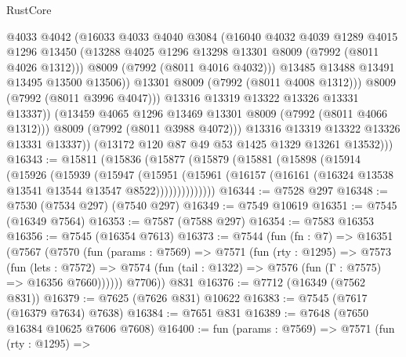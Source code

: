 \begin{lexlean}{RustCore}
\begin{coremodule}
                        @4033
                        @4042
                        (@16033
                          @4033
                          @4040
                          @3084
                          (@16040
                            @4032
                            @4039
                            @1289
                            @4015
                            @1296
                            @13450
                            (@13288 @4025 @1296 @13298 @13301 @8009 (@7992 (@8011 @4026 @1312)))
                            @8009
                            (@7992 (@8011 @4016 @4032)))
                          @13485
                          @13488
                          @13491
                          @13495
                          @13500
                          @13506))
                      @13301
                      @8009
                      (@7992 (@8011 @4008 @1312)))
                    @8009
                    (@7992 (@8011 @3996 @4047)))
                  @13316
                  @13319
                  @13322
                  @13326
                  @13331
                  @13337))
              (@13459 @4065 @1296 @13469 @13301 @8009 (@7992 (@8011 @4066 @1312)))
              @8009
              (@7992 (@8011 @3988 @4072)))
            @13316
            @13319
            @13322
            @13326
            @13331
            @13337))
        (@13172 @120 @87 @49 @53 @1425 @1329 @13261 @13532)))
@16343 := @15811
    (@15836
      (@15877
        (@15879
          (@15881
            (@15898
              (@15914
                (@15926
                  (@15939
                    (@15947
                      (@15951
                        (@15961
                          (@16157 (@16161 (@16324 @13538 @13541 @13544 @13547 @8522))))))))))))))
@16344 := @7528 @297
@16348 := @7530 (@7534 @297) (@7540 @297)
@16349 := @7549 @10619
@16351 := @7545 (@16349 @7564)
@16353 := @7587 (@7588 @297)
@16354 := @7583 @16353
@16356 := @7545 (@16354 @7613)
@16373 := @7544
    (fun (fn : @7) =>
    @16351
      (@7567
        (@7570
          (fun (params : @7569) =>
          @7571
            (fun (rty : @1295) =>
            @7573
              (fun (lets : @7572) =>
              @7574 (fun (tail : @1322) => @7576 (fun (Γ : @7575) => @16356 @7660))))))
        @7706))
    @831
@16376 := @7712 (@16349 (@7562 @831))
@16379 := @7625 (@7626 @831) @10622
@16383 := @7545 (@7617 (@16379 @7634) @7638)
@16384 := @7651 @831
@16389 := @7648 (@7650 @16384 @10625 @7606 @7608)
@16400 := fun (params : @7569) =>
  @7571
    (fun (rty : @1295) =>

\end{coremodule}
\end{lexlean}
